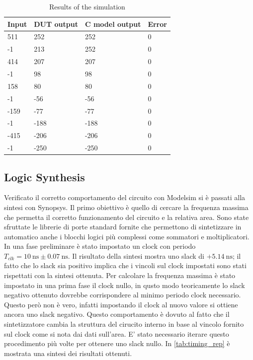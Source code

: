 \begin{table}[h]
\begin{center}
\begin{tabular}{|l|l|l|l|}
\hline
Input & DUT output & C model output & Error \\
\hline
511 & 252 & 252 & 0 \\
-1 & 213 & 252 & 0 \\
414 & 207 & 207 & 0 \\
-1 & 98 & 98 & 0 \\
158 & 80 & 80 & 0 \\
-1 & -56 & -56 & 0 \\
-159 & -77 & -77 & 0 \\
-1 & -188 & -188 & 0 \\
-415 & -206 & -206 & 0 \\
-1 & -250 & -250 & 0 \\
\hline
\end{tabular}
\end{center}
\caption{Results of the simulation}
\label{tab:tab_results}
\end{table}


\subsection{Logic Synthesis}
Verificato il corretto comportamento del circuito con Modelsim si è passati alla sintesi con Synopsys. Il primo obiettivo è quello di cercare la frequenza massima che permetta il corretto funzionamento del circuito e la relativa area. Sono state sfruttate le librerie di porte standard fornite che permettono di sintetizzare in automatico anche i blocchi logici più complessi come sommatori e moltiplicatori.
In una fase preliminare è stato impostato un clock con periodo $T_{clk} = \SI{10}{\nano\second} \pm \SI{0.07}{\nano\second}$. Il risultato della sintesi mostra uno slack di $+\SI{5.14}{\nano\second}$; il fatto che lo slack sia positivo implica che i vincoli sul clock impostati sono stati rispettati con la sintesi ottenuta.
Per calcolare la frequenza massima è stato impostato in una prima fase il clock nullo, in qusto modo teoricamente lo slack negativo ottenuto dovrebbe corrispondere al minimo periodo clock necessario. Questo però non è vero, infatti impostando il clock al nuovo valore si ottiene ancora uno slack negativo. Questo comportamento è dovuto al fatto che il sintetizzatore cambia la struttura del cirucito interno in base al vincolo fornito sul clock come si nota dai dati sull'area. E' stato necessario iterare questo procedimento più volte per ottenere uno slack nullo. In \autoref{tab:timing_rep} è mostrata una sintesi dei risultati ottenuti.


